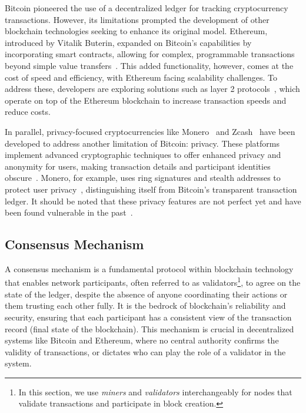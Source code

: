 Bitcoin pioneered the use of a decentralized ledger for tracking cryptocurrency transactions. However, its limitations prompted the development of other blockchain technologies seeking to enhance its original model. Ethereum, introduced by Vitalik Buterin, expanded on Bitcoin’s capabilities by incorporating smart contracts, allowing for complex, programmable transactions beyond simple value transfers~\cite{buterin2014next}. This added functionality, however, comes at the cost of speed and efficiency, with Ethereum facing scalability challenges. To address these, developers are exploring solutions such as layer 2 protocols~\cite{clark2018sok:online,optimismgithub,kalodner2018arbitrum}, which operate on top of the Ethereum blockchain to increase transaction speeds and reduce costs.

In parallel, privacy-focused cryptocurrencies like Monero~\cite{monero} and Zcash~\cite{hopwood2016zcash} have been developed to address another limitation of Bitcoin: privacy. These platforms implement advanced cryptographic techniques to offer enhanced privacy and anonymity for users, making transaction details and participant identities obscure~\cite{van2013cryptonote, miers2013zerocoin}. Monero, for example, uses ring signatures and stealth addresses to protect user privacy~\cite{cryptoeprint2015}, distinguishing itself from Bitcoin's transparent transaction ledger. It should be noted that these privacy features are not perfect yet and have been found vulnerable in the past~\cite{kumar2017traceability,MMLN17}.



\subsection{Consensus Mechanism}\label{consensus_mechanism}
A consensus mechanism is a fundamental protocol within blockchain technology that enables network participants, often referred to as validators\footnote{In this section, we use \textit{miners} and \textit{validators} interchangeably for nodes that validate transactions and participate in block creation.}, to agree on the state of the ledger, despite the absence of anyone coordinating their actions or them trusting each other fully. It is the bedrock of blockchain's reliability and security, ensuring that each participant has a consistent view of the transaction record (final state of the blockchain). This mechanism is crucial in decentralized systems like Bitcoin and Ethereum, where no central authority confirms the validity of transactions, or dictates who can play the role of a validator in the system. 

